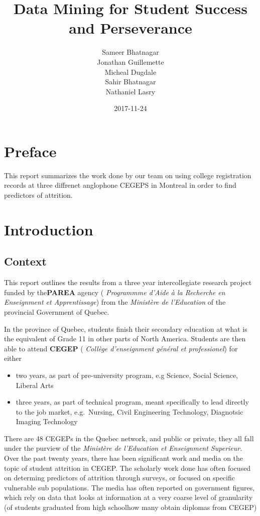 \documentclass[]{book}
\title{Data Mining for Student Success and Perseverance}
\author{Sameer Bhatnagar \\ Jonathan Guillemette \\ Micheal Dugdale \\ Sahir Bhatnagar \\ Nathaniel Lasry}
\date{2017-11-24}
\providecommand{\tightlist}{%
  \setlength{\itemsep}{0pt}\setlength{\parskip}{0pt}}
\theoremstyle{definition}
\theoremstyle{definition}
\theoremstyle{remark}
\begin{document}
\maketitle

{
\setcounter{tocdepth}{1}
\tableofcontents
}
\chapter{Preface}\label{preface}

This report summarizes the work done by our team on using college
registration records at three diffrenet anglophone CEGEPS in Montreal in
order to find predictors of attrition.

\chapter{Introduction}\label{intro}

\section{Context}\label{context}

This report outlines the results from a three year intercollegiate
research project funded by the\textbf{PAREA} agency ( \emph{Programmme
d'Aide à la Recherche en Enseignment et Apprentissage}) from the
\emph{Ministère de l'Education} of the provincial Government of Quebec.

In the province of Quebec, students finish their secondary education at
what is the equivalent of Grade 11 in other parts of North America.
Students are then able to attend \textbf{CEGEP} ( \emph{Collège
d'enseignment général et professionel}) for either

\begin{itemize}
\tightlist
\item
  two years, as part of pre-university program, e.g Science, Social
  Science, Liberal Arts
\item
  three years, as part of technical program, meant specifically to lead
  directly to the job market, e.g.~Nursing, Civil Engineering
  Technology, Diagnotsic Imaging Technology
\end{itemize}

There are 48 CEGEPs in the Quebec network, and public or private, they
all fall under the purview of the \emph{Ministère de l'Education et
Enseignment Superieur}. Over the past twenty years, there has been
significant
work\citep{jorgensen2003students, jorgensen2005academic, jorgensen2009predicting, riviere1995decrocheurs, shaienks2008statcan}
and media
\citep{breton2016soleil, dion-viens2015lapresse, duchaine2017lapresse}
on the topic of student attrition in CEGEP. The scholarly work done has
often focused on determing predictors of attrition through surveys, or
focused on specific vulnerable sub populations. The media has often
reported on government figures, which rely on data that looks at
information at a very coarse level of granularity (of students graduated
from high schoolhow many obtain diplomas from CEGEP)
\end{document}
